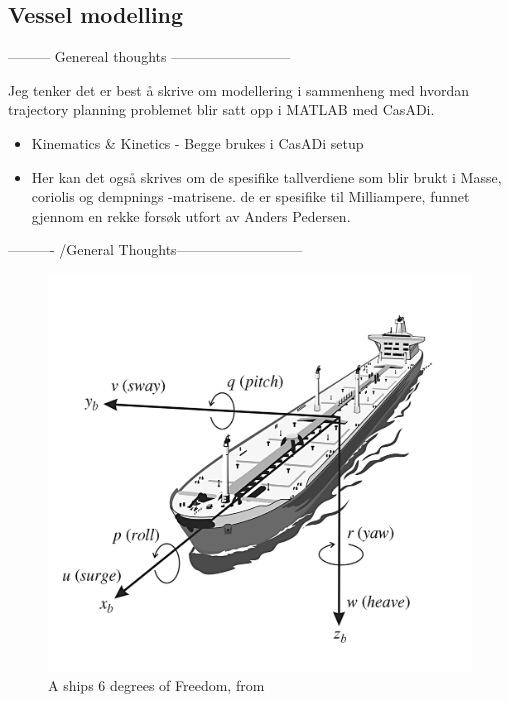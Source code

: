 \subsection{Vessel modelling}
--------- Genereal thoughts --------------------------

Jeg tenker det er best å skrive om modellering i sammenheng med hvordan trajectory planning problemet blir satt opp i MATLAB med CasADi.
\begin{itemize}
    \item Kinematics \& Kinetics -\> Begge brukes i CasADi setup
    \item Her kan det også skrives om de spesifike tallverdiene som blir brukt i Masse, coriolis og dempnings -matrisene.
    de er spesifike til Milliampere, funnet gjennom en rekke forsøk utfort av Anders Pedersen.
\end{itemize}
---------- /General Thoughts--------------------------- 

\begin{figure}
    \centering
    \label{FIG: Ship DOF}
    \includegraphics[height=0.35\textheight]{Images/SHIPDOF_FOSSEN.png}
    \caption{A ships 6 degrees of Freedom, from \cite{fossen2011handbook}}
\end{figure}

